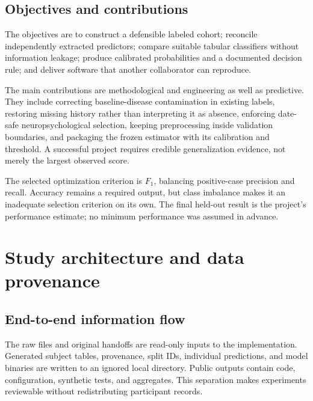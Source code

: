 \documentclass[11pt,a4paper]{article}
\begin{document}
\subsection{Objectives and contributions}
The objectives are to construct a defensible labeled cohort; reconcile independently extracted predictors; compare suitable tabular classifiers without information leakage; produce calibrated probabilities and a documented decision rule; and deliver software that another collaborator can reproduce.

The main contributions are methodological and engineering as well as predictive. They include correcting baseline-disease contamination in existing labels, restoring missing history rather than interpreting it as absence, enforcing date-safe neuropsychological selection, keeping preprocessing inside validation boundaries, and packaging the frozen estimator with its calibration and threshold. A successful project requires credible generalization evidence, not merely the largest observed score.

The selected optimization criterion is $F_1$, balancing positive-case precision and recall. Accuracy remains a required output, but class imbalance makes it an inadequate selection criterion on its own. The final held-out result is the project's performance estimate; no minimum performance was assumed in advance.

\clearpage
\section{Study architecture and data provenance}
\subsection{End-to-end information flow}
\begin{center}\end{center}
The raw files and original handoffs are read-only inputs to the implementation. Generated subject tables, provenance, split IDs, individual predictions, and model binaries are written to an ignored local directory. Public outputs contain code, configuration, synthetic tests, and aggregates. This separation makes experiments reviewable without redistributing participant records.
\end{document}
